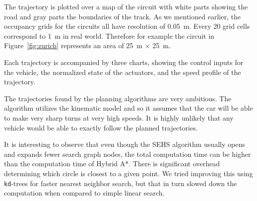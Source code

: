 The trajectory is plotted over a map of the circuit with white parts showing the road and gray parts the boundaries of the track. As we mentioned earlier, the occupancy grids for the circuits all have resolution of \SI{0.05}{\meter}. Every \num{20} grid cells correspond to \SI{1}{\meter} in real world. Therefore for example the circuit in Figure~\ref{fig:zurich} represents an area of \SI{25}{\meter} $\times$ \SI{25}{\meter}.

Each trajectory is accompanied by three charts, showing the control inputs for the vehicle, the normalized state of the actuators, and the speed profile of the trajectory.


The trajectories found by the planning algorithms are very ambitious. The algorithm utilizes the kinematic model and so it assumes that the car will be able to make very sharp turns at very high speeds. It is highly unlikely that any vehicle would be able to exactly follow the planned trajectories.

It is interesting to observe that even though the \gls*{SEHS} algorithm usually opens and expands fewer search graph nodes, the total computation time can be higher than the computation time of Hybrid A*. There is significant overhead determining which circle is closest to a given point. We tried improving this using \texttt{kd}-trees for faster nearest neighbor search, but that in turn slowed down the computation when compared to simple linear search.

